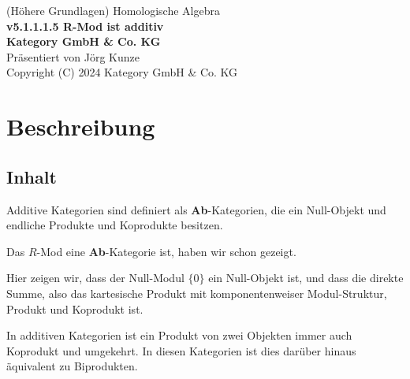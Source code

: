 \documentclass[a4paper]{amsart}
\theoremstyle{definition}
\begin{document}
\begin{titlepage}
\centering
{\huge
(Höhere Grundlagen) Homologische Algebra\\[1cm]
\textbf{v5.1.1.1.5 R-Mod ist additiv}
}\\[1cm]

\textbf{Kategory GmbH \& Co. KG}\\
Präsentiert von Jörg Kunze\\
Copyright (C) 2024 Kategory GmbH \& Co. KG

\end{titlepage}

%

\newpage

\section*{Beschreibung}

\subsection*{Inhalt}
Additive Kategorien sind definiert als \textbf{Ab}-Kategorien, die ein Null-Objekt und endliche Produkte und Koprodukte besitzen.

Das $R$-Mod eine \textbf{Ab}-Kategorie ist, haben wir schon gezeigt.

Hier zeigen wir, dass der Null-Modul $\{0\}$ ein Null-Objekt ist, und dass die direkte Summe, also das kartesische Produkt mit komponentenweiser Modul-Struktur, Produkt und Koprodukt ist.

In additiven Kategorien ist ein Produkt von zwei Objekten immer auch Koprodukt und umgekehrt. In diesen Kategorien ist dies darüber hinaus äquivalent zu Biprodukten.
\end{document}
